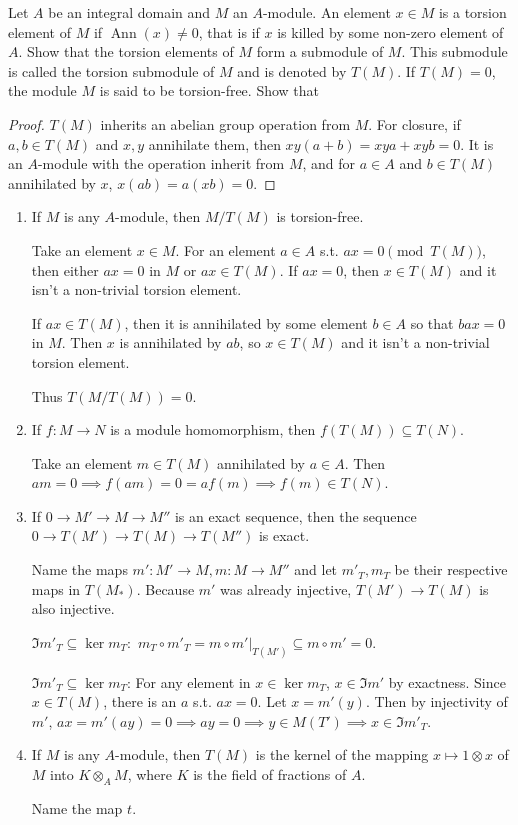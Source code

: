 \documentclass[a4paper]{exam}
\begin{document}
\begin{questions}
\question Let $A$ be an integral domain and $M$ an $A$-module. An element $x \in M$ is a torsion element of $M$ if $\operatorname{Ann} (x) \ne 0$, that is if $x$ is killed by some non-zero element of $A$. Show that the torsion elements of $M$ form a submodule of $M$. This submodule is called the torsion submodule of $M$ and is denoted by $T(M)$. If $T(M) = 0$, the module $M$ is said to be torsion-free. Show that 
\begin{proof}
	$T(M) $ inherits an abelian group operation from $M $.
	For closure, if $a,b \in T(M) $ and $x,y $ annihilate them, then $xy(a+b) = xya + xyb = 0$.
	It is an $A $-module with the operation inherit from $M $, and for $a\in A $ and $b \in T(M) $ annihilated by $x $, $x(ab) = a(xb) = 0$.
\end{proof}
\begin{enumerate}
	\item If $M $ is any $A $-module, then $M / T(M) $ is torsion-free.
	\begin{solution}
		Take an element $x \in M $.
		For an element $a \in A$ s.t. $ax = 0\pmod {T(M)} $, then either $ax = 0 $ in $M $ or $ax \in T(M) $.
		If $ax = 0 $, then $x \in T(M) $ and it isn't a non-trivial torsion element.

		If $ax\in T(M) $, then it is annihilated by some element $b\in A $ so that $bax = 0 $ in $M $.
		Then $x $ is annihilated by $ab $, so $x\in T(M) $ and it isn't a non-trivial torsion element.

		Thus $T(M / T(M)) = 0 $.
	\end{solution}
	\item If $f: M\to N $ is a module homomorphism, then $f(T(M)) \subseteq T(N) $.
	\begin{solution}
		Take an element $m \in T(M) $ annihilated by $a\in A$.
		Then $am = 0 \implies f(am) = 0 = af(m) \implies f(m) \in T(N)$.
	\end{solution}
	\item If $0\to M' \to M \to M'' $ is an exact sequence, then the sequence $0 \to T(M') \to T(M) \to T(M'')$ is exact.
	\begin{solution}
		Name the maps $m': M'\to M, m: M\to M''$ and let $m'_T,m_T $ be their respective maps in $T(M_{\ast}) $.
		Because $m' $ was already injective, $T(M') \to T(M) $ is also injective.
		
		$\Im m'_T\subseteq \ker m_T: $ $m_T \circ m'_T = m\circ m'|_{T(M')} \subseteq m\circ m' = 0 $.

		$\Im m'_T \subseteq \ker m_T $: For any element in $x \in \ker m_T $, $x \in \Im m'$ by exactness.
		Since $x\in T(M) $, there is an $a $ s.t. $ax = 0 $.
		Let $x = m'(y) $.
		Then by injectivity of $m' $, $ax = m'(ay) = 0 \implies ay = 0 \implies y \in M(T') \implies x \in \Im m'_T $.
	\end{solution}
	\item If $M $ is any $A $-module, then $T(M) $ is the kernel of the mapping $x\mapsto 1 \otimes x $ of $M $ into $K \otimes _A M $, where $K $ is the field of fractions of $A $.
	\begin{solution}
		Name the map $t $.


\end{solution}
\end{enumerate}
\end{questions}
\end{document}
